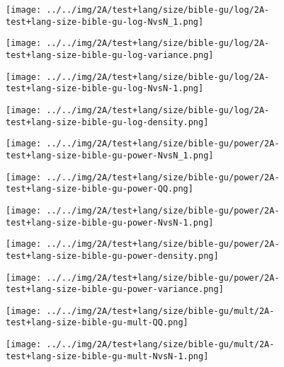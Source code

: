 \begin{figure}[H]
\centering	\texttt{[image: ../../img/2A/test+lang/size/bible-gu/log/2A-test+lang-size-bible-gu-log-NvsN\_1.png]}
\end{figure}
\begin{figure}[H]
\centering	\texttt{[image: ../../img/2A/test+lang/size/bible-gu/log/2A-test+lang-size-bible-gu-log-variance.png]}
\end{figure}
\begin{figure}[H]
\centering	\texttt{[image: ../../img/2A/test+lang/size/bible-gu/log/2A-test+lang-size-bible-gu-log-NvsN-1.png]}
\end{figure}
\begin{figure}[H]
\centering	\texttt{[image: ../../img/2A/test+lang/size/bible-gu/log/2A-test+lang-size-bible-gu-log-density.png]}
\end{figure}
\begin{figure}[H]
\centering	\texttt{[image: ../../img/2A/test+lang/size/bible-gu/power/2A-test+lang-size-bible-gu-power-NvsN\_1.png]}
\end{figure}
\begin{figure}[H]
\centering	\texttt{[image: ../../img/2A/test+lang/size/bible-gu/power/2A-test+lang-size-bible-gu-power-QQ.png]}
\end{figure}
\begin{figure}[H]
\centering	\texttt{[image: ../../img/2A/test+lang/size/bible-gu/power/2A-test+lang-size-bible-gu-power-NvsN-1.png]}
\end{figure}
\begin{figure}[H]
\centering	\texttt{[image: ../../img/2A/test+lang/size/bible-gu/power/2A-test+lang-size-bible-gu-power-density.png]}
\end{figure}
\begin{figure}[H]
\centering	\texttt{[image: ../../img/2A/test+lang/size/bible-gu/power/2A-test+lang-size-bible-gu-power-variance.png]}
\end{figure}
\begin{figure}[H]
\centering	\texttt{[image: ../../img/2A/test+lang/size/bible-gu/mult/2A-test+lang-size-bible-gu-mult-QQ.png]}
\end{figure}
\begin{figure}[H]
\centering	\texttt{[image: ../../img/2A/test+lang/size/bible-gu/mult/2A-test+lang-size-bible-gu-mult-NvsN-1.png]}
\end{figure}
